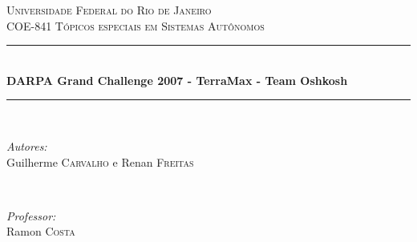 \documentclass[12pt]{article}
\begin{document}
\begin{titlepage}

\newcommand{\HRule}{\rule{\linewidth}{0.5mm}} %

\center %


\textsc{\LARGE Universidade Federal do Rio de Janeiro}\\[1.5cm]
\textsc{\Large COE-841 Tópicos especiais em Sistemas Autônomos}\\[0.5cm] %


\HRule \\[0.4cm]
{ \huge \bfseries DARPA Grand Challenge 2007 -  TerraMax - Team Oshkosh}\\[0.4cm] %
\HRule \\[1.5cm]


\begin{minipage}{0.4\textwidth}
\begin{flushleft} \large
\emph{Autores:}\\
Guilherme \textsc{Carvalho} e Renan \textsc{Freitas}
\end{flushleft}
\end{minipage}
~
\begin{minipage}{0.4\textwidth}
\begin{flushright} \large
\emph{Professor:} \\
Ramon \textsc{Costa}
\end{flushright}
\end{minipage}\\[2cm]




\end{titlepage}
\end{document}

